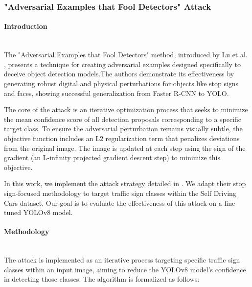 \documentclass[../main.tex]{subfiles}
\begin{document}
\subsubsection{"Adversarial Examples that Fool Detectors" Attack}
\paragraph{Introduction}\leavevmode\\
The "Adversarial Examples that Fool Detectors" method, introduced by Lu et al. \cite{lu2017fooldetectors}, presents a technique for creating adversarial examples designed specifically to deceive object detection models.The authors demonstrate its effectiveness by generating robust digital and physical perturbations for objects like stop signs and faces, showing successful generalization from Faster R-CNN to YOLO.

The core of the attack is an iterative optimization process that seeks to minimize the mean confidence score of all detection proposals corresponding to a specific target class. To ensure the adversarial perturbation remains visually subtle, the objective function includes an L2 regularization term that penalizes deviations from the original image. The image is updated at each step using the sign of the gradient (an L-infinity projected gradient descent step) to minimize this objective.

In this work, we implement the attack strategy detailed in \cite{lu2017fooldetectors}. We adapt their stop sign-focused methodology to target traffic sign classes within the Self Driving Cars dataset. Our goal is to evaluate the effectiveness of this attack on a fine-tuned YOLOv8 model.
\paragraph{Methodology}\leavevmode\\
The attack is implemented as an iterative process targeting specific traffic sign classes within an input image, aiming to reduce the YOLOv8 model's confidence in detecting those classes.
The algorithm is formalized as follows:
\end{document}
